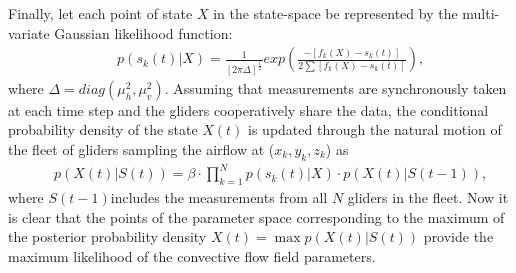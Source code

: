 \documentclass{ifacconf}
\begin{document}
Finally, let each point of state $X$ in the state-space be represented by the
multi-variate Gaussian likelihood function:
\begin{eqnarray*}
    && p(s_k(t)\vert X)=\frac{1}{[2\pi \Delta]^\frac{1}{2}}  exp( \frac{-[f_k(X)-s_k(t)]}{2 \sum
    [f_k(X)-s_k(t)] }),
    \label{eq:BayesLikeLH}
\end{eqnarray*}
where $\Delta=diag(\mu^2_h,\mu^2_v)$. Assuming that measurements are
synchronously taken at each time step and the gliders cooperatively share the
data, the conditional probability density of the state $X(t)$ is updated
through the natural motion of the fleet of gliders sampling the airflow at
($x_k,y_k,z_k$) as
\begin{eqnarray}
    && p(X(t)\vert S(t))=\beta \cdot \prod_{k=1}^N p(s_k(t) \vert X)\cdot p(X(t) \vert S(t-1)),
    \label{eq:PostProb}
\end{eqnarray}
where $S(t-1)$includes the measurements from all $N$ gliders in the fleet.
Now it is clear that the points of the parameter space corresponding to the
maximum of the posterior probability density $X(t)=\max p(X(t) \vert S(t))$
provide the maximum likelihood of the convective flow field parameters.
%
\end{document}
